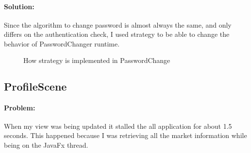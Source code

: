 \documentclass[a4paper,12pt]{report}
\begin{document}
        \paragraph{Solution:}Since the algorithm to change password is almost always the same, and only differs on the authentication check, I used strategy to be able to change the behavior of PasswordChanger runtime.
            \begin{figure}[H]
                \caption{How strategy is implemented in PasswordChange}
                \label{fig:my_label}
            \end{figure}
        
    \subsection{ProfileScene}
        \paragraph{Problem:}When my view was being updated it stalled the all application for about 1.5 seconds. This happened because I was retrieving all the market information while being on the JavaFx thread.
\end{document}
